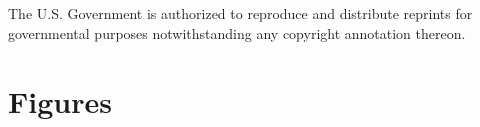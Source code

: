 \documentclass[utf8]{frontiersSCNS}
\begin{document}
The U.S. Government is authorized to reproduce and distribute reprints for governmental purposes notwithstanding any copyright annotation thereon.
%
%
%
%




\clearpage
\section*{Figures}
\end{document}
